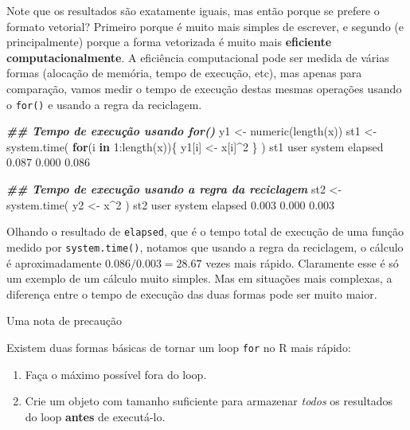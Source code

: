 \documentclass[
  10pt,
  a4paper]{book}
\newenvironment{Shaded}{\begin{snugshade}}{\end{snugshade}}
\newcommand{\ControlFlowTok}[1]{\textcolor[rgb]{0.13,0.29,0.53}{\textbf{#1}}}
\newcommand{\DecValTok}[1]{\textcolor[rgb]{0.00,0.00,0.81}{#1}}
\newcommand{\DocumentationTok}[1]{\textcolor[rgb]{0.56,0.35,0.01}{\textbf{\textit{#1}}}}
\newcommand{\FloatTok}[1]{\textcolor[rgb]{0.00,0.00,0.81}{#1}}
\newcommand{\FunctionTok}[1]{\textcolor[rgb]{0.00,0.00,0.00}{#1}}
\newcommand{\NormalTok}[1]{#1}
\newcommand{\OtherTok}[1]{\textcolor[rgb]{0.56,0.35,0.01}{#1}}
\newcommand{\SpecialCharTok}[1]{\textcolor[rgb]{0.00,0.00,0.00}{#1}}
\providecommand{\tightlist}{%
  \setlength{\itemsep}{0pt}\setlength{\parskip}{0pt}}
\begin{document}
Note que os resultados são exatamente iguais, mas então porque se
prefere o formato vetorial? Primeiro porque é muito mais simples de
escrever, e segundo (e principalmente) porque a forma vetorizada é
muito mais \textbf{eficiente computacionalmente}. A eficiência computacional
pode ser medida de várias formas (alocação de memória, tempo de
execução, etc), mas apenas para comparação, vamos medir o tempo de
execução destas mesmas operações usando o \texttt{for()} e usando a regra da
reciclagem.

\begin{Shaded}
\begin{Highlighting}[]
\DocumentationTok{\#\# Tempo de execução usando for()}
\NormalTok{y1 }\OtherTok{\textless{}{-}} \FunctionTok{numeric}\NormalTok{(}\FunctionTok{length}\NormalTok{(x))}
\NormalTok{st1 }\OtherTok{\textless{}{-}} \FunctionTok{system.time}\NormalTok{(}
    \ControlFlowTok{for}\NormalTok{(i }\ControlFlowTok{in} \DecValTok{1}\SpecialCharTok{:}\FunctionTok{length}\NormalTok{(x))\{}
\NormalTok{        y1[i] }\OtherTok{\textless{}{-}}\NormalTok{ x[i]}\SpecialCharTok{\^{}}\DecValTok{2}
\NormalTok{    \}}
\NormalTok{)}
\NormalTok{st1}
\NormalTok{   user  system elapsed }
  \FloatTok{0.087}   \FloatTok{0.000}   \FloatTok{0.086} 

\DocumentationTok{\#\# Tempo de execução usando a regra da reciclagem}
\NormalTok{st2 }\OtherTok{\textless{}{-}} \FunctionTok{system.time}\NormalTok{(}
\NormalTok{    y2 }\OtherTok{\textless{}{-}}\NormalTok{ x}\SpecialCharTok{\^{}}\DecValTok{2}
\NormalTok{)}
\NormalTok{st2}
\NormalTok{   user  system elapsed }
  \FloatTok{0.003}   \FloatTok{0.000}   \FloatTok{0.003} 
\end{Highlighting}
\end{Shaded}

Olhando o resultado de \texttt{elapsed}, que é o tempo total de execução de uma
função medido por \texttt{system.time()}, notamos que usando a regra da
reciclagem, o cálculo é aproximadamente
\(0.086/0.003 = 28.67\) vezes mais rápido.
Claramente esse é só um exemplo de um cálculo muito simples. Mas em
situações mais complexas, a diferença entre o tempo de execução das duas
formas pode ser muito maior.

Uma nota de precaução

Existem duas formas básicas de tornar um loop \texttt{for} no R mais rápido:

\begin{enumerate}
\def\labelenumi{\arabic{enumi}.}
\tightlist
\item
  Faça o máximo possível fora do loop.
\item
  Crie um objeto com tamanho suficiente para armazenar \emph{todos} os
  resultados do loop \textbf{antes} de executá-lo.
\end{enumerate}
\end{document}
